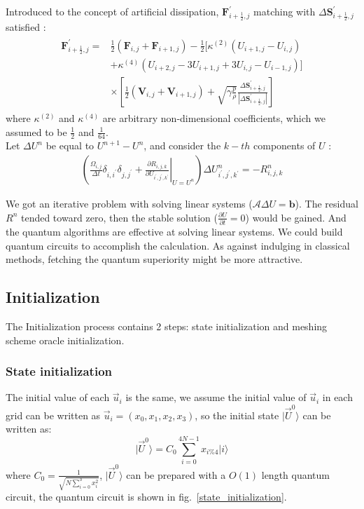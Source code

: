 \documentclass[%
 reprint,
 amsmath,amssymb,
pra,
]{revtex4-1}
\begin{document}
\begin{itemize}
Introduced to the concept of artificial dissipation, $\bm{F}^\prime_{i+\frac{1}{2}, j}$ matching with $\Delta\bm{S}^\prime_{i+\frac{1}{2}, j}$ satisfied \cite{hirsch2007numerical} \cite{jameson1981numerical}:
\begin{align}
\begin{split}
    \bm{F}^\prime_{i+\frac{1}{2}, j} =& \frac{1}{2}\left(\bm{F}_{i, j} + \bm{F}_{i + 1, j}\right) - \frac{1}{2}\big[\kappa^{\left(2\right)}\left(U_{i+1, j}-U_{i, j}\right)\\
    &+\kappa^{\left(4\right)}\left(U_{i+2, j}-3 U_{i+1, j}+3 U_{i, j}-U_{i-1, j}\right)\big]\\
    &\times\left[\frac{1}{2}\left(\bm{V}_{i, j} + \bm{V}_{i + 1, j}\right) + \sqrt{\gamma \frac{p}{\rho}}\frac{\Delta\bm{S}^\prime_{i+\frac{1}{2}, j}}{\left|\Delta\bm{S}^\prime_{i+\frac{1}{2}, j}\right|}\right]
\end{split}
\end{align}
where $\kappa^{\left(2\right)}$ and $\kappa^{\left(4\right)}$ are arbitrary non-dimensional coefficients, which we assumed to be $\frac{1}{2}$ and $\frac{1}{64}$.\\
Let $\Delta U^{n}$ be equal to $U^{n+1}-U^{n}$, and consider the $k-th$ components of $U$ \cite{economon2015su2}:
\begin{align}
	\left(\frac{\Omega_{i, j}}{\Delta t}\delta_{i, i^\prime}\delta_{j, j^\prime}+\left.\frac{\partial R_{i,j,k}}{\partial U_{i^\prime,j^\prime,k^\prime}}\right|_{U=U^n}\right)\Delta U^{n}_{i^\prime,j^\prime,k^\prime} = -R^{n}_{i,j,k}
\end{align}

We got an iterative problem with solving linear systems ($\mathcal{A} \Delta U = \bm{b}$). The residual $R^{n}$ tended toward zero, then the stable solution ($\frac{\partial U}{\partial t} = 0$) would be gained. And the quantum algorithms are effective at solving linear systems. We could build quantum circuits to accomplish the calculation. As against indulging in classical methods, fetching the quantum superiority might be more attractive.



\subsection{Initialization}

The Initialization process contains 2 steps: state initialization and meshing scheme oracle initialization.
\subsubsection{State initialization}
The initial value of  each $\vec{u}_i$ is the same, we assume the initial value of $\vec{u}_i$ in each grid can be written as $\vec{u}_i=(x_0,x_1,x_2,x_3)$, so the initial state  $|\vec{U}^0\rangle$ can be written as:
$$
|\vec{U}^0\rangle=C_0\sum_{i=0}^{4N-1}{x_{i\%4}|i\rangle}
$$
where $C_0=\frac{1}{\sqrt{N\sum_{i=0}^{3}{x_i^2}}}$, $|\vec{U}^0\rangle$ can be prepared with a $O(1)$ length quantum circuit, the quantum circuit is shown in fig.~\ref{state_initialization}.


\end{itemize}
\end{document}
